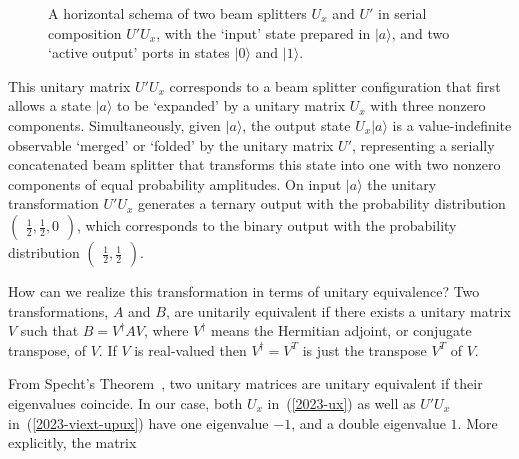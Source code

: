 \documentclass[%
 superscriptaddress,
  preprint,
 showpacs,
 showkeys,
 nofootinbib,
  amsmath,amssymb,
 pra,
  longbibliography,
  floatfix,
 ]{revtex4-2}
\theoremstyle{definition}
\begin{document}
\begin{figure}
\begin{center}
\end{center}
                \caption{A horizontal schema of two beam splitters $U_x$ and $U'$ in serial composition $U'U_x$,
with the `input' state prepared in $\vert a\rangle$,
and two `active output' ports in states $\vert 0\rangle$ and $\vert 1\rangle$.}
\label{2023-viext-souubone2}
\end{figure}



This unitary matrix $U'U_x$ corresponds to a beam splitter configuration that first allows a state $\vert a\rangle$ to be `expanded' by a unitary matrix $U_x$ with three nonzero components. Simultaneously,
given $\vert a\rangle$, the output state $U_x\vert a\rangle$ is a value-indefinite observable `merged' or `folded' by the unitary matrix $U'$,
representing a serially concatenated beam splitter that transforms this state
into one with two nonzero components of equal probability amplitudes.
On input $\vert a\rangle $ the unitary transformation  $U'U_x$ generates a ternary output
with the probability distribution
$\begin{pmatrix}\frac{1}{2},\frac{1}{2},0\end{pmatrix}$, which corresponds to the binary output with the probability distribution
$\begin{pmatrix}\frac{1}{2},\frac{1}{2}\end{pmatrix}$.


How can we realize this transformation in terms of unitary equivalence?
Two transformations, $A$ and $B$, are unitarily equivalent if there exists a unitary matrix $V$ such that $B = V^\dagger AV$, where
$V^\dagger$ means the Hermitian adjoint, or conjugate transpose, of $V$.
If $V$ is real-valued then $V^\dagger =V^T$ is just the transpose $V^T$ of $V$.


From Specht's Theorem~\cite{Horn-Johnson-MatrixAnalysis,Dokovi__2007}, two unitary matrices are unitary equivalent if their eigenvalues coincide.
In our case, both $U_x$ in~(\ref{2023-ux}) as well as $U'U_x$ in~(\ref{2023-viext-upux}) have one eigenvalue $-1$, and a double eigenvalue $1$.
More explicitly, the matrix
\end{document}
